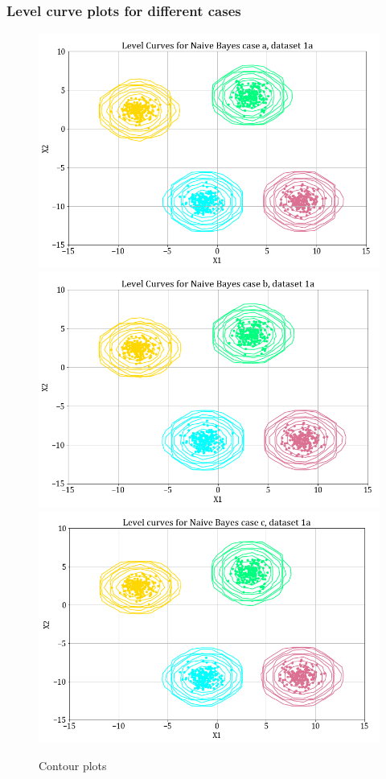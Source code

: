 \documentclass[11pt,a4paper]{article}
\begin{document}
\subsubsection{Level curve plots for different cases}

\begin{figure}[H]
    \centering
    \includegraphics[scale=0.6]{images/contour1b_case1.png}
    \includegraphics[scale=0.6]{images/contour1b_case2.png}
    \includegraphics[scale=0.6]{images/contour1b_case3.png}
    \caption{Contour plots}
    \label{fig:cp_1}
\end{figure}
\end{document}
